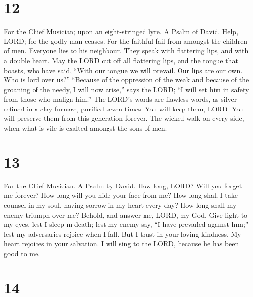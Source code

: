 \hypertarget{section-11}{%
\section{12}\label{section-11}}

For the Chief Musician; upon an eight-stringed lyre. A Psalm of David.
 Help, LORD; for the godly man ceases. For the faithful
fail from amongst the children of men.  Everyone lies to
his neighbour. They speak with flattering lips, and with a double heart.
 May the LORD cut off all flattering lips, and the tongue
that boasts,  who have said, ``With our tongue we will
prevail. Our lips are our own. Who is lord over us?'' 
``Because of the oppression of the weak and because of the groaning of
the needy, I will now arise,'' says the LORD; ``I will set him in safety
from those who malign him.''  The LORD's words are
flawless words, as silver refined in a clay furnace, purified seven
times.  You will keep them, LORD. You will preserve them
from this generation forever.  The wicked walk on every
side, when what is vile is exalted amongst the sons of men.

\hypertarget{section-12}{%
\section{13}\label{section-12}}

For the Chief Musician. A Psalm by David.  How long, LORD?
Will you forget me forever? How long will you hide your face from me?
 How long shall I take counsel in my soul, having sorrow
in my heart every day? How long shall my enemy triumph over me?
 Behold, and answer me, LORD, my God. Give light to my
eyes, lest I sleep in death;  lest my enemy say, ``I have
prevailed against him;'' lest my adversaries rejoice when I fall.
 But I trust in your loving kindness. My heart rejoices in
your salvation.  I will sing to the LORD, because he has
been good to me.

\hypertarget{section-13}{%
\section{14}\label{section-13}}

